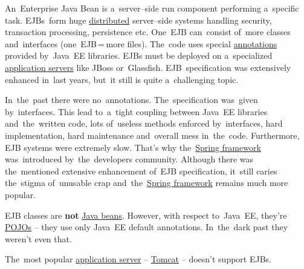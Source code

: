 \label{ejb}
An~Enterprise Java Bean is a~server--side run component performing a~specific task.
EJBs~form huge \hyperref[distributedsystem]{distributed} server--side systems handling security, transaction processing, persistence etc.
One~EJB can~consist of~more classes and~interfaces (one~EJB\,=\,more files).
The~code uses special \hyperref[annotations]{annotations} provided by~Java~EE libraries.
EJBs must be deployed on a~specialized \hyperref[applicationserver]{application servers} like JBoss or~Glassfish.
EJB~specification was extensively enhanced in~last years, but~it still is quite a~challenging topic.

In~the~past there were no~annotations.
The~specification was~given by~interfaces.
This lead to~a~tight coupling between Java~EE libraries and~the~written code, lots of~useless methods enforced by~interfaces, hard implementation, hard maintenance and~overall mess in~the~code.
Furthermore, EJB systems were extremely slow.
That's why the~\hyperref[springframework]{Spring framework} was~introduced by~the~developers community.
Although there was the~mentioned extensive enhancement of~EJB specification, it~still caries the~stigma of~unusable crap and~the~\hyperref[springframework]{Spring framework} remains much more popular.

\warning EJB classes are \textbf{not} \hyperref[javabeans]{Java beans}.
However, with respect to~Java~EE, they're \hyperref[pojo]{POJOs} -- they use only Java~EE default annotations.
In~the~dark past they weren't even that.

\warning The~most popular \hyperref[applicationserver]{application server} -- \hyperref[tomcat]{Tomcat} -- doesn't support EJBs.
